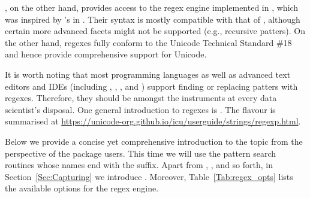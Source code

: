 \documentclass[nojss]{jss}
\begin{document}
, on the other hand, provides access to the regex engine
implemented in , which was inspired
by 's 
in . Their syntax is mostly compatible with that of ,
although certain more advanced facets might not be supported (e.g., recursive
patters). On the other hand,  regexes fully conform to the
Unicode Technical Standard \#18 \citep{uts18:regex} and hence provide
comprehensive support for Unicode.


It is worth noting that most programming languages
as well as advanced text editors and IDEs (including
, , , and )
support finding or replacing patters with regexes.
Therefore, they should be amongst the instruments
at every data scientist's disposal.
One general introduction to regexes is \citep{friedl}.
The  flavour is summarised at
\url{https://unicode-org.github.io/icu/userguide/strings/regexp.html}.






Below we provide a concise yet comprehensive introduction
to the topic from the perspective of the  package users.
This time we will use the pattern search routines whose names
end with the  suffix.
Apart from , ,
and so forth, in Section~\ref{Sec:Capturing} we introduce
.
Moreover, Table~\ref{Tab:regex_opts} lists the available options
for the regex engine.


\end{document}
